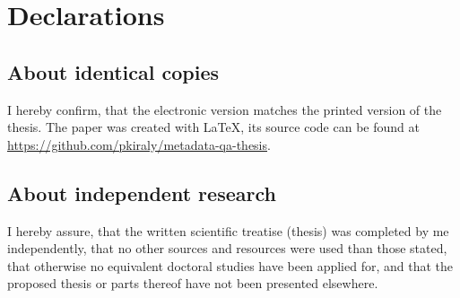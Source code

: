\chapter{Declarations}

\section{About identical copies}

I hereby confirm, that the electronic version matches the printed version of the thesis. The paper was created with \LaTeX, its source code can be found at \url{https://github.com/pkiraly/metadata-qa-thesis}.

\section{About independent research}

I hereby assure, that the written scientific treatise (thesis) was completed by me independently, that no other sources and resources were used than those stated, that otherwise no equivalent doctoral studies have been applied for, and that the proposed thesis or parts thereof have not been presented elsewhere.